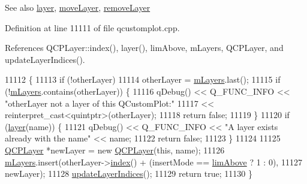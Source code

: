 \begin{DoxySeeAlso}{See also}
\hyperlink{class_q_custom_plot_aac492da01782820454e9136a8db28182}{layer}, \hyperlink{class_q_custom_plot_ae896140beff19424e9e9e02d6e331104}{move\+Layer}, \hyperlink{class_q_custom_plot_a40f75e342c5eaab6a86066a42a0e2a94}{remove\+Layer} 
\end{DoxySeeAlso}


Definition at line 11111 of file qcustomplot.\+cpp.



References Q\+C\+P\+Layer\+::index(), layer(), lim\+Above, m\+Layers, Q\+C\+P\+Layer, and update\+Layer\+Indices().


\begin{DoxyCode}
11112                                                                   \{
11113   \textcolor{keywordflow}{if} (!otherLayer)
11114     otherLayer = \hyperlink{class_q_custom_plot_a9685e7ec1ef5e6066dd7d91bb3a698b3}{mLayers}.last();
11115   \textcolor{keywordflow}{if} (!\hyperlink{class_q_custom_plot_a9685e7ec1ef5e6066dd7d91bb3a698b3}{mLayers}.contains(otherLayer)) \{
11116     qDebug() << Q\_FUNC\_INFO << \textcolor{stringliteral}{"otherLayer not a layer of this QCustomPlot:"}
11117              << \textcolor{keyword}{reinterpret\_cast<}quintptr\textcolor{keyword}{>}(otherLayer);
11118     \textcolor{keywordflow}{return} \textcolor{keyword}{false};
11119   \}
11120   \textcolor{keywordflow}{if} (\hyperlink{class_q_custom_plot_aac492da01782820454e9136a8db28182}{layer}(name)) \{
11121     qDebug() << Q\_FUNC\_INFO << \textcolor{stringliteral}{"A layer exists already with the name"} << name;
11122     \textcolor{keywordflow}{return} \textcolor{keyword}{false};
11123   \}
11124 
11125   \hyperlink{class_q_c_p_layer}{QCPLayer} *newLayer = \textcolor{keyword}{new} \hyperlink{class_q_custom_plot_a5dbf96bf7664c1b6fce49063eeea6eef}{QCPLayer}(\textcolor{keyword}{this}, name);
11126   \hyperlink{class_q_custom_plot_a9685e7ec1ef5e6066dd7d91bb3a698b3}{mLayers}.insert(otherLayer->\hyperlink{class_q_c_p_layer_ad5d7010829a6b99f326b07d7e37c8c99}{index}() + (insertMode == \hyperlink{class_q_custom_plot_a75a8afbe6ef333b1f3d47abb25b9add7a062b0b7825650b432a713c0df6742d41}{limAbove} ? 1 : 0),
11127                  newLayer);
11128   \hyperlink{class_q_custom_plot_a3117754df3a5638787a6223c7147970f}{updateLayerIndices}();
11129   \textcolor{keywordflow}{return} \textcolor{keyword}{true};
11130 \}
\end{DoxyCode}


